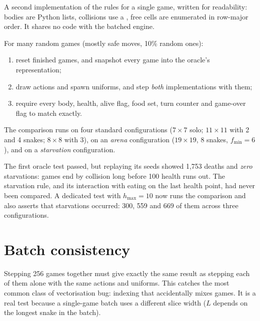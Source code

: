 \begin{defbox}
A second implementation of the rules for a single game, written for readability:
bodies are Python lists, collisions use a , free cells are enumerated in
row-major order. It shares no code with the batched engine.
\end{defbox}

\begin{algbox}
For many random games (mostly safe moves, 10\% random ones):
\begin{enumerate}
\item reset finished games, and snapshot every game into the oracle's representation;
\item draw actions and spawn uniforms, and step \emph{both} implementations with them;
\item require every body, health, alive flag, food set, turn counter and game-over flag
  to match exactly.
\end{enumerate}
\end{algbox}

The comparison runs on four standard configurations ($7\times7$ solo; $11\times11$ with 2
and 4 snakes; $8\times8$ with 3), on an \emph{arena} configuration ($19\times19$, 8
snakes, $f_{\min}=6$), and on a \emph{starvation} configuration.

\begin{warnbox}
The first oracle test passed, but replaying its seeds showed 1{,}753 deaths and
\emph{zero} starvations: games end by collision long before 100 health runs out. The
starvation rule, and its interaction with eating on the last health point, had never
been compared. A dedicated test with $h_{\max}=10$ now runs the comparison and also
asserts that starvations occurred: 300, 559 and 669 of them across three configurations.
\end{warnbox}

\section{Batch consistency}

Stepping 256 games together must give exactly the same result as stepping each of them
alone with the same actions and uniforms. This catches the most common class of
vectorisation bug: indexing that accidentally mixes games. It is a real test because a
single-game batch uses a different slice width ($L$ depends on the longest snake in the
batch).

